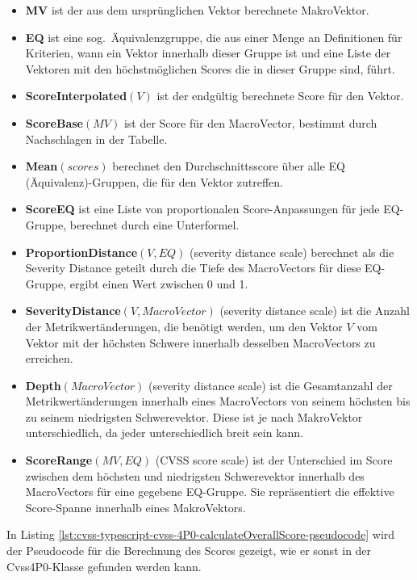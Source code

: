 \begin{itemize}[noitemsep]
    \item \textbf{MV} ist der aus dem ursprünglichen Vektor berechnete MakroVektor.
    \item \textbf{EQ} ist eine sog.\ Äquivalenzgruppe, die aus einer Menge an Definitionen für Kriterien, wann ein Vektor innerhalb dieser Gruppe ist und eine Liste der Vektoren mit den höchstmöglichen Scores die in dieser Gruppe sind, führt.
    \item \textbf{ScoreInterpolated$(V)$} ist der endgültig berechnete Score für den Vektor.
    \item \textbf{ScoreBase$(MV)$} ist der Score für den MacroVector, bestimmt durch Nachschlagen in der Tabelle.
    \item \textbf{Mean$(scores)$} berechnet den Durchschnittsscore über alle EQ (Äquivalenz)-Gruppen, die für den Vektor zutreffen.
    \item \textbf{ScoreEQ} ist eine Liste von proportionalen Score-Anpassungen für jede EQ-Gruppe, berechnet durch eine Unterformel.
    \item \textbf{ProportionDistance$(V, EQ)$} (severity distance scale) berechnet als die Severity Distance geteilt durch die Tiefe des MacroVectors für diese EQ-Gruppe, ergibt einen Wert zwischen 0 und 1.
    \item \textbf{SeverityDistance$(V, MacroVector)$} (severity distance scale) ist die Anzahl der Metrikwertänderungen, die benötigt werden, um den Vektor $V$ vom Vektor mit der höchsten Schwere innerhalb desselben MacroVectors zu erreichen.
    \item \textbf{Depth$(MacroVector)$} (severity distance scale) ist die Gesamtanzahl der Metrikwertänderungen innerhalb eines MacroVectors von seinem höchsten bis zu seinem niedrigsten Schwerevektor.
    Diese ist je nach MakroVektor unterschiedlich, da jeder unterschiedlich breit sein kann.
    \item \textbf{ScoreRange$(MV, EQ)$} (CVSS score scale) ist der Unterschied im Score zwischen dem höchsten und niedrigsten Schwerevektor innerhalb des MacroVectors für eine gegebene EQ-Gruppe.
    Sie repräsentiert die effektive Score-Spanne innerhalb eines MakroVektors.
\end{itemize}

In Listing \ref{lst:cvss-typescript-cvss-4P0-calculateOverallScore-pseudocode} wird der Pseudocode für die Berechnung des Scores gezeigt, wie er sonst in der Cvss4P0-Klasse gefunden werden kann.

